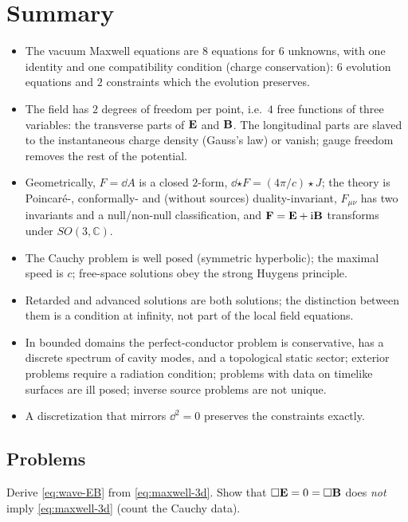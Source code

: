 \section{Summary}\label{sec:mx-summary}

\begin{itemize}
\item The vacuum Maxwell equations are $8$ equations for $6$ unknowns,
  with one identity and one compatibility condition (charge
  conservation): $6$ evolution equations and $2$ constraints which the
  evolution preserves.
\item The field has $2$ degrees of freedom per point, i.e.\ $4$ free
  functions of three variables: the transverse parts of $\mathbf{E}$ and $\mathbf{B}$.
  The longitudinal parts are slaved to the instantaneous charge density
  (Gauss's law) or vanish; gauge freedom removes the rest of the
  potential.
\item Geometrically, $F=\dd A$ is a closed $2$-form, $\dd{\star F}=(4\pi/c)\star J$;
  the theory is Poincar\'e-, conformally- and (without sources)
  duality-invariant, $F_{\mu\nu}$ has two invariants and a null/non-null classification,
  and $\mathbf F=\mathbf{E}+\mathrm{i}\mathbf{B}$ transforms under $SO(3,\mathbb C)$.
\item The Cauchy problem is well posed (symmetric hyperbolic); the
  maximal speed is $c$; free-space solutions obey the strong Huygens
  principle.
\item Retarded and advanced solutions are both solutions; the
  distinction between them is a condition at infinity, not part of the
  local field equations.
\item In bounded domains the perfect-conductor problem is conservative, has a
  discrete spectrum of cavity modes, and a topological static sector;
  exterior problems require a radiation condition; problems with data on
  timelike surfaces are ill posed; inverse source problems are not unique.
\item A discretization that mirrors $\dd^2=0$ preserves the
  constraints exactly.
\end{itemize}

\subsection*{Problems}

\begin{problem}
Derive \eqref{eq:wave-EB} from \eqref{eq:maxwell-3d}.  Show that
$\Box\mathbf{E}=0=\Box\mathbf{B}$ does \emph{not} imply \eqref{eq:maxwell-3d} (count
the Cauchy data).
\end{problem}

